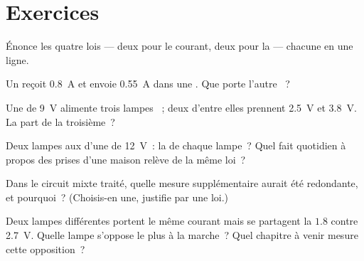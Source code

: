 \section{Exercices}

\begin{exercise}[$\star$]\label{exo:g8:circuit-laws:1}
Énonce les quatre lois --- deux pour le courant, deux pour la
 --- chacune en une ligne.
\end{exercise}

\begin{exercise}[$\star$]\label{exo:g8:circuit-laws:2}
Un  reçoit \qty{0.8}{A} et envoie \qty{0.55}{A} dans une .
Que porte l'autre ~?
\end{exercise}

\begin{exercise}[$\star$]\label{exo:g8:circuit-laws:3}
Une  de \qty{9}{V} alimente trois lampes ~; deux d'entre
elles prennent \qty{2.5}{V} et \qty{3.8}{V}. La part de la
troisième~?
\end{exercise}

\begin{exercise}[$\star$]\label{exo:g8:circuit-laws:4}
Deux lampes  aux  d'une  de \qty{12}{V}~: la
 de chaque lampe~? Quel fait quotidien à propos des prises
d'une maison relève de la même loi~?
\end{exercise}

\begin{exercise}[$\star$]\label{exo:g8:circuit-laws:5}
Dans le circuit mixte traité, quelle mesure supplémentaire aurait été
redondante, et pourquoi~? (Choisis-en une, justifie par une loi.)
\end{exercise}

\begin{exercise}[$\star$]\label{exo:g8:circuit-laws:6}
Deux lampes différentes  portent le même courant mais se
partagent la  $1.8$ contre \qty{2.7}{V}. Quelle lampe
s'oppose le plus à la marche~? Quel chapitre à venir mesure cette
opposition~?
\end{exercise}

